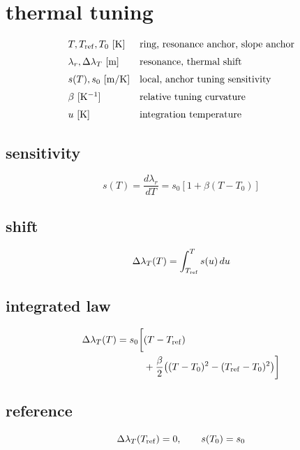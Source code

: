 \section*{thermal tuning}
\[
\begin{array}{ll}T,T_{\rm ref},T_0\ [\mathrm K]&\text{ring, resonance anchor, slope anchor}\\[0.6em]\lambda_r,\Delta\lambda_T\ [\mathrm m]&\text{resonance, thermal shift}\\[0.6em]s(T),s_0\ [\mathrm{m/K}]&\text{local, anchor tuning sensitivity}\\[0.6em]\beta\ [\mathrm{K^{-1}}]&\text{relative tuning curvature}\\[0.6em]u\ [\mathrm K]&\text{integration temperature}\end{array}
\]
\subsection*{sensitivity}
\[
\displaystyle s(T)=\frac{d\lambda_r}{dT}=s_0[1+\beta(T-T_0)]
\]
\subsection*{shift}
\[
\displaystyle \Delta\lambda_T(T)=\int_{T_{\rm ref}}^T s(u)\,du
\]
\subsection*{integrated law}
\[
\displaystyle \begin{aligned}\Delta\lambda_T(T)=s_0\biggl[&(T-T_{\rm ref})\\&+\frac{\beta}{2}\bigl((T-T_0)^2-(T_{\rm ref}-T_0)^2\bigr)\biggr]\end{aligned}
\]
\subsection*{reference}
\[
\displaystyle \Delta\lambda_T(T_{\rm ref})=0,\qquad s(T_0)=s_0
\]
